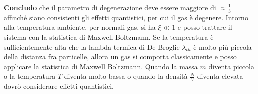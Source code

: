 \textbf{Concludo} che il parametro di degenerazione deve essere maggiore di $\approx \frac{1}{3}$ affinché siano consistenti gli effetti quantistici, per cui il gas è degenere.
Intorno alla temperatura ambiente, per normali gas, si ha $\xi \ll 1$ e posso trattare il sistema con la statistica di Maxwell Boltzmann.
Se la temperatura è sufficientemente alta che la lambda termica di De Broglie $\lambda_{th}$ è molto più piccola della distanza fra particelle, allora un gas si comporta classicamente e posso applicare la statistica di Maxwell Boltzmann. 
Quando la massa $m$ diventa piccola o la temperatura $T$ diventa molto bassa o quando la densità $\frac{N}{V}$ diventa elevata dovrò considerare effetti quantistici.





